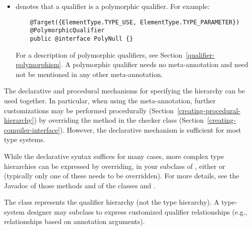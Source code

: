 \begin{itemize}
\item {} denotes that a qualifier is a
  polymorphic qualifier.  For example:

  \begin{Verbatim}
    @Target({ElementType.TYPE_USE, ElementType.TYPE_PARAMETER})
    @PolymorphicQualifier
    public @interface PolyNull {}
  \end{Verbatim}

  For a description of polymorphic qualifiers, see
  Section~\ref{qualifier-polymorphism}.  A polymorphic qualifier needs
  no  meta-annotation and need not be
  mentioned in any other 
  meta-annotation.

\end{itemize}

The declarative and procedural mechanisms for specifying the hierarchy can
be used together.  In particular, when using the 
meta-annotation, further customizations may be
performed procedurally (Section~\ref{creating-procedural-hierarchy})
by overriding the  method in the checker class
(Section~\ref{creating-compiler-interface}).
However, the declarative mechanism is sufficient for most type systems.



While the declarative syntax suffices for many cases, more complex
type hierarchies can be expressed by overriding, in your subclass of ,
either  or  (typically
only one of these needs to be overridden).
For more details, see the Javadoc of those methods and of the classes
 and .

The  class represents the qualifier hierarchy (not the
type hierarchy).  A type-system designer may subclass
 to express customized qualifier
relationships (e.g., relationships based on annotation
arguments).


